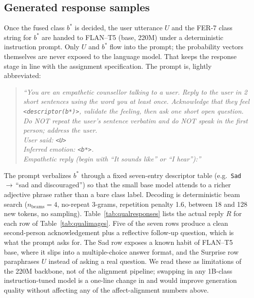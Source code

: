 \documentclass[sigconf,nonacm]{acmart}
\begin{document}
\subsection{Generated response samples}\label{sec:gen-samples}
Once the fused class $b^{*}$ is decided, the user utterance $U$ and the FER-7 class string for $b^{*}$ are handed to FLAN--T5 (base, 220M) under a deterministic instruction prompt. Only $U$ and $b^{*}$ flow into the prompt; the probability vectors themselves are never exposed to the language model. That keeps the response stage in line with the assignment specification. The prompt is, lightly abbreviated:
\begin{quote}\small\itshape
``You are an empathetic counsellor talking to a user. Reply to the user in 2 short sentences using the word \emph{you} at least once. Acknowledge that they feel \texttt{<descriptor(b*)>}, validate the feeling, then ask one short open question. Do NOT repeat the user's sentence verbatim and do NOT speak in the first person; address the user.\\ User said: \texttt{<U>}\\ Inferred emotion: \texttt{<b*>}.\\ Empathetic reply (begin with ``It sounds like'' or ``I hear''):''
\end{quote}
The prompt verbalizes $b^{*}$ through a fixed seven-entry descriptor table (e.g.\ \texttt{Sad}\,$\to$\,``sad and discouraged'') so that the small base model attends to a richer adjective phrase rather than a bare class label. Decoding is deterministic beam search ($n_\text{beams}\!=\!4$, no-repeat 3-grams, repetition penalty 1.6, between 18 and 128 new tokens, no sampling). Table~\ref{tab:qualresponses} lists the actual reply $R$ for each row of Table~\ref{tab:qualimages}. Five of the seven rows produce a clean second-person acknowledgement plus a reflective follow-up question, which is what the prompt asks for. The Sad row exposes a known habit of FLAN--T5 base, where it slips into a multiple-choice answer format, and the Surprise row paraphrases $U$ instead of asking a real question. We read these as limitations of the 220M backbone, not of the alignment pipeline; swapping in any 1B-class instruction-tuned model is a one-line change in  and would improve generation quality without affecting any of the affect-alignment numbers above.
\end{document}
